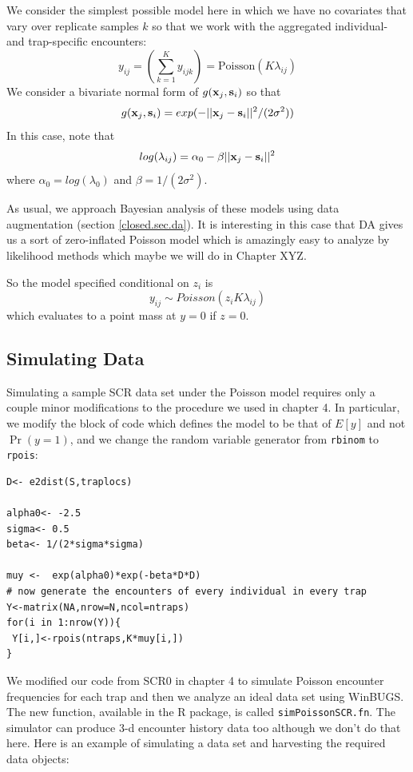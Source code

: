 We consider the simplest possible model here in which we have no
covariates that vary over replicate samples $k$ so that we work with
the aggregated individual- and trap-specific encounters:
\[
y_{ij} = (\sum_{k=1}^{K} y_{ijk}) =  \mbox{Poisson}(K  \lambda_{ij})
\]
We consider a bivariate normal form of $g({\bf x}_{j},{\bf s}_{i})$ so
that
\[
g({\bf x}_{j},{\bf s}_{i}) = exp( -||{\bf x}_{j} - {\bf
  s}_{i}||^{2} /(2\sigma^{2}))
\]
In this case, note that 
\[
log( \lambda_{ij})  =\alpha_{0} - \beta ||{\bf x}_{j} - {\bf s}_{i}||^2
\]
where $\alpha_{0} = log(\lambda_{0})$ and $\beta = 1/(2\sigma^2)$.


As usual, we approach Bayesian analysis of these
models using data augmentation (section \ref{closed.sec.da}). 
It is interesting in this case that DA
gives us a sort of zero-inflated Poisson model which is amazingly easy
to analyze by likelihood methods which maybe we will do in Chapter
XYZ.

So the model specified conditional on $z_{i}$ is
\[
y_{ij} \sim  Poisson(z_{i} K  \lambda_{ij})
\]
which evaluates to a point mass at $y=0$ if $z=0$. 



\subsection{Simulating Data}

Simulating a sample SCR data set under the Poisson model requires only
a couple minor modifications to the procedure we used in chapter 4. In
particular, we modify the block of code which defines the model to be
that of $E[y]$ and not $\Pr(y=1)$, and we change the random variable
generator from \mbox{\tt rbinom} to \mbox{\tt rpois}:
\begin{verbatim}
D<- e2dist(S,traplocs)

alpha0<- -2.5
sigma<- 0.5
beta<- 1/(2*sigma*sigma)

muy <-  exp(alpha0)*exp(-beta*D*D)
# now generate the encounters of every individual in every trap
Y<-matrix(NA,nrow=N,ncol=ntraps)
for(i in 1:nrow(Y)){
 Y[i,]<-rpois(ntraps,K*muy[i,])
}
\end{verbatim}

We modified our code from SCR0 in chapter 4 to simulate Poisson
encounter frequencies for each trap and then we analyze an ideal data
set using WinBUGS. The new function, available in the R package, is called
{\tt simPoissonSCR.fn}. 
The simulator can produce 3-d encounter history data too although we
don't do that here. 
Here is an example of simulating a data set and harvesting the
required data objects:

